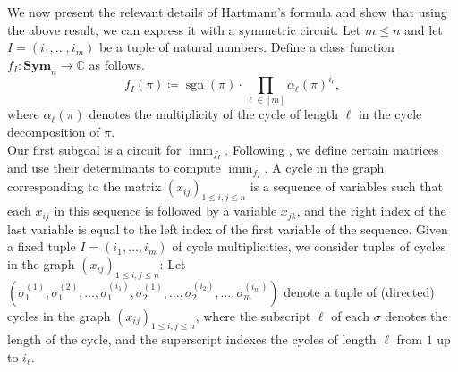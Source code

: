 \documentclass[11pt, DIV=15]{scrarticle}
\theoremstyle{definition}
\theoremstyle{plain}
\theoremstyle{remark}
\newcommand{\Sym}{\mathbf{Sym}}
\DeclareMathOperator{\imm}{imm}
\DeclareMathOperator{\sgn}{sgn}
\begin{document}
We now present the relevant details of Hartmann's formula and show that using the above result, we can express it with a symmetric circuit. 
Let $m \leq n$ and let $I = (i_1,\dots ,i_m)$ be a tuple of natural numbers. Define a class function $f_I\colon \Sym_n \to \mathbb{C}$ as follows. 
\[
f_I(\pi) \coloneqq \sgn(\pi)\cdot \prod_{\ell \in [m]} \alpha_\ell(\pi)^{i_\ell}, 
\]
where $\alpha_\ell(\pi)$ denotes the multiplicity of the cycle of length $\ell$ in the cycle decomposition of $\pi$.\\ 

Our first subgoal is a circuit for $\imm_{f_I}$. Following \cite{hartmann1985complexity}, we define certain matrices and use their determinants to compute $\imm_{f_I}$.
A cycle in the graph corresponding to the matrix $(x_{ij})_{1 \leq i,j \leq n}$ is a sequence of variables such that each $x_{ij}$ in this sequence is followed by a variable $x_{jk}$, and the right index of the last variable is equal to the left index of the first variable of the sequence. 
Given a fixed tuple $I = (i_1,\dots ,i_m)$ of cycle multiplicities, we consider tuples of cycles in the graph $(x_{ij})_{1 \leq i,j \leq n}$:
Let $(\sigma_1^{(1)}, \sigma_1^{(2)}, \dots , \sigma_1^{(i_1)}, \sigma_2^{(1)}, \dots , \sigma_2^{(i_2)}, \dots , \sigma_m^{(i_m)})$ denote a tuple of (directed) cycles in the graph $(x_{ij})_{1\leq i,j \leq n}$, where the subscript $\ell$ of each $\sigma$ denotes the length of the cycle, and the superscript indexes the cycles of length $\ell$ from $1$ up to $i_\ell$. 
\end{document}

